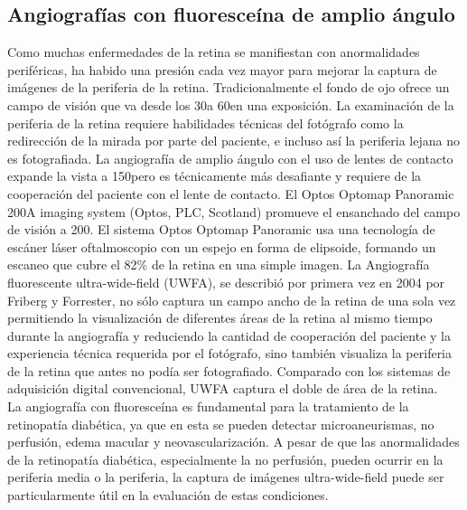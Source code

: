 	\subsection{Angiograf\'ias con fluoresce\'ina de amplio ángulo}

Como muchas enfermedades de la retina se manifiestan con anormalidades periféricas, ha habido una presión cada vez mayor para mejorar la captura de im\'agenes de la periferia de la retina. 
Tradicionalmente el fondo de ojo ofrece un campo de visi\'on que va desde los 30\degree a 60\degree en una exposición. La examinación de la periferia de la retina requiere habilidades técnicas del fotógrafo como la redirección de la mirada por parte del paciente, e incluso as\'i la periferia lejana no es fotografiada.
La angiografía de amplio ángulo con el uso de lentes de contacto expande la vista a 150\degree pero es técnicamente más desafiante y requiere de la cooperación del paciente con el lente de contacto. 
El Optos Optomap Panoramic 200A imaging system (Optos, PLC, Scotland) promueve el ensanchado del campo de visión a 200\degree. El sistema  Optos Optomap Panoramic usa una tecnología de escáner láser oftalmoscopio con un espejo en forma de elipsoide, formando un escaneo que cubre el 82\% de la retina en  una simple imagen.
La Angiografía  fluorescente ultra-wide-field (UWFA), se describió por primera vez en 2004 por Friberg y Forrester, no sólo captura un campo ancho de la retina de una sola vez  permitiendo la visualización de diferentes áreas de la retina  al mismo  tiempo durante la angiografía y reduciendo la cantidad de cooperación del paciente y la experiencia técnica requerida por el fotógrafo, sino también visualiza la periferia de la retina que antes no podía ser fotografiado. Comparado con los sistemas de adquisición digital convencional, UWFA captura el doble de área de la retina.
\\
La angiografía con fluoresceína es fundamental para la tratamiento de la retinopatía diabética, ya que en esta se pueden detectar microaneurismas, no perfusión, edema macular y neovascularización. A pesar de que las anormalidades de la retinopatía diabética, especialmente la no perfusión, pueden ocurrir en la periferia media o la periferia, la captura de imágenes ultra-wide-field puede ser particularmente útil en la evaluación de estas condiciones.\cite{patel2014ultra}	


